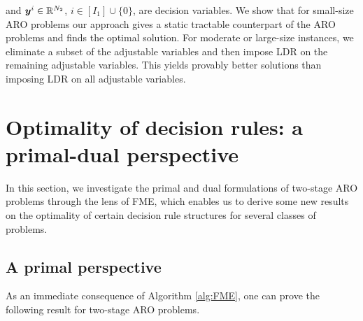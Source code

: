 \documentclass[fleqn,mnsc,blindrev]{informs4}
\newcommand{\mb}[1]{\mbox{\boldmath \ensuremath{#1}}}
\renewcommand{\Re}{\mathbb{R}}
\begin{document}
and $\mb{y}^i \in \Re^{N_2}$, $i\in [I_1]\cup \{0\}$, are decision variables. We show that for small-size ARO problems our approach gives a static tractable counterpart of the ARO problems and finds the optimal solution. For moderate or large-size instances, we eliminate a subset of the adjustable variables and then impose LDR on the remaining adjustable variables. This yields provably better solutions than imposing LDR on all adjustable variables.
	

		
	\section{Optimality of decision rules: a primal-dual perspective} \label{sec:ODR}
	In this section, we investigate the primal and dual formulations of two-stage ARO problems through the lens of FME, which enables us to derive some new results on the optimality of certain decision rule structures for several classes of problems.
	
\subsection{A primal perspective}
As an immediate consequence of Algorithm \ref{alg:FME}, one can prove the following result for two-stage ARO problems. 
\end{document}
